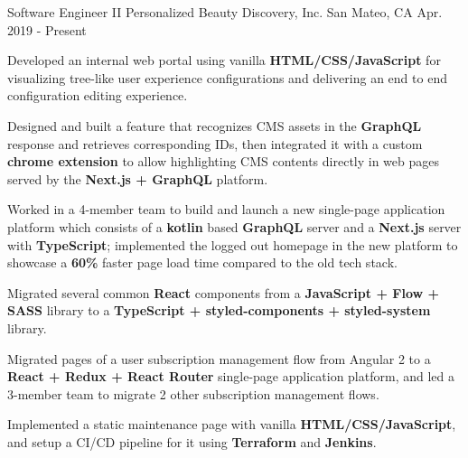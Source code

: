

\begin{cventries}

  \cventry
    {Software Engineer II} %
    {Personalized Beauty Discovery, Inc.} %
    {San Mateo, CA} %
    {Apr. 2019 - Present} %
    {
      \begin{cvitems} %
        \item {Developed an internal web portal using vanilla \textbf{HTML/CSS/JavaScript} for visualizing tree-like user experience configurations and delivering an end to end configuration editing experience.}
        \item {Designed and built a feature that recognizes CMS assets in the \textbf{GraphQL} response and retrieves corresponding IDs, then integrated it with a custom \textbf{chrome extension} to allow highlighting CMS contents directly in web pages served by the \textbf{Next.js + GraphQL} platform.}
        \item {Worked in a 4-member team to build and launch a new single-page application platform which consists of a \textbf{kotlin} based \textbf{GraphQL} server and a \textbf{Next.js} server with \textbf{TypeScript}; implemented the logged out homepage in the new platform to showcase a \textbf{60\%} faster page load time compared to the old tech stack.}
        \item {Migrated several common \textbf{React} components from a \textbf{JavaScript + Flow + SASS} library to a \textbf{TypeScript + styled-components + styled-system} library.}
        \item {Migrated pages of a user subscription management flow from Angular 2 to a \textbf{React + Redux + React Router} single-page application platform, and led a 3-member team to migrate 2 other subscription management flows.}
        \item {Implemented a static maintenance page with vanilla \textbf{HTML/CSS/JavaScript}, and setup a CI/CD pipeline for it using \textbf{Terraform} and \textbf{Jenkins}.}
      \end{cvitems}
    }


\end{cventries}
